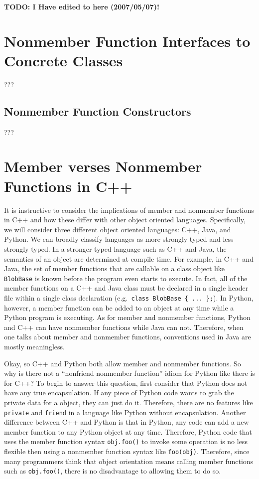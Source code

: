\documentclass[pdf,ps2pdf,11pt]{SANDreport}
\begin{document}
{}\textbf{TODO: I Have edited to here (2007/05/07)!}

%
\section{Nonmember Function Interfaces to Concrete Classes}
%

???

%
\subsection{Nonmember Function Constructors}
%

???


%
\section{Member verses Nonmember Functions in C++}
%

It is instructive to consider the implications of member and nonmember
functions in C++ and how these differ with other object oriented languages.
Specifically, we will consider three different object oriented languages: C++,
Java, and Python.  We can broadly classify languages as more strongly typed
and less strongly typed.  In a stronger typed language such as C++ and Java,
the semantics of an object are determined at compile time.  For example, in
C++ and Java, the set of member functions that are callable on a class object
like {}\texttt{BlobBase} is known before the program even starts to execute.
In fact, all of the member functions on a C++ and Java class must be declared
in a single header file within a single class declaration (e.g.\
{}\texttt{class BlobBase \{ ... \};}).  In Python, however, a member function
can be added to an object at any time while a Python program is executing.  As
for member and nonmember functions, Python and C++ can have nonmember
functions while Java can not.  Therefore, when one talks about member and
nonmember functions, conventions used in Java are mostly meaningless.

Okay, so C++ and Python both allow member and nonmember functions. So why is
there not a ``nonfriend nonmember function'' idiom for Python like there is
for C++?  To begin to answer this question, first consider that Python does
not have any true encapsulation.  If any piece of Python code wants to grab
the private data for a object, they can just do it.  Therefore, there are no
features like {}\texttt{private} and {}\texttt{friend} in a language like
Python without encapsulation.  Another difference between C++ and Python is
that in Python, any code can add a new member function to any Python object at
any time.  Therefore, Python code that uses the member function syntax
{}\texttt{obj.foo()} to invoke some operation is no less flexible then using a
nonmember function syntax like {}\texttt{foo(obj)}.  Therefore, since many
programmers think that object orientation means calling member functions such
as {}\texttt{obj.foo()}, there is no disadvantage to allowing them to do so.
\end{document}
